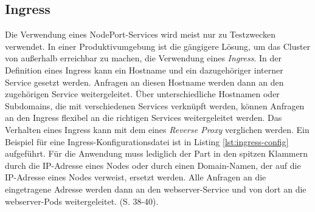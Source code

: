 \documentclass[11pt,a4paper]{article}
\begin{document}
\subsection{Ingress}
\label{sec:Ingress}
Die Verwendung eines NodePort-Services wird meist nur zu Testzwecken verwendet. In einer Produktivumgebung
ist die gängigere Lösung, um das Cluster von außerhalb erreichbar zu machen, die Verwendung eines \emph{Ingress}.
In der Definition eines Ingress kann ein Hostname und ein dazugehöriger interner Service gesetzt werden.
Anfragen an diesen Hostname werden dann an den zugehörigen Service weitergeleitet. Über unterschiedliche Hostnamen
oder Subdomains, die mit verschiedenen Services verknüpft werden, können Anfragen an den Ingress flexibel
an die richtigen Services weitergeleitet werden. Das Verhalten eines Ingress kann mit dem eines \emph{Reverse Proxy} \cite{nginx}
verglichen werden.
Ein Beispiel für eine Ingress-Konfigurationsdatei ist in Listing \ref{lst:ingress-config} aufgeführt.
Für die Anwendung muss lediglich der Part in den spitzen Klammern durch die IP-Adresse eines Nodes
oder durch einen Domain-Namen, der auf die IP-Adresse eines Nodes verweist, ersetzt werden.
Alle Anfragen an die eingetragene Adresse werden dann an den webserver-Service
und von dort an die webserver-Pods weitergeleitet. \cite{Schmeling_Dargatz_2022} (S. 38-40).

\end{document}
